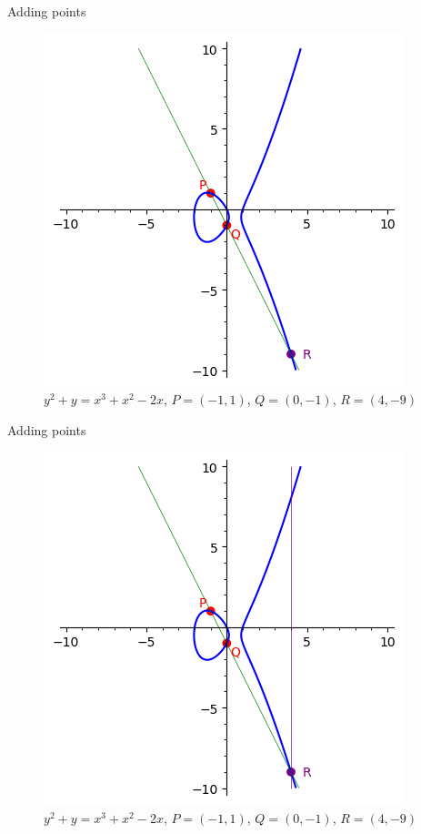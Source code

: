 \documentclass[aspectratio=169,xcolor=dvipsnames]{beamer}
\begin{document}

\begin{frame}{Adding points}
    \begin{figure}
        \centering
        \includegraphics[height=0.7\textheight]{adding-points-04.png}
        \caption{$y^2 + y = x^3 + x^2 - 2x$, $P=(-1,1)$, $Q=(0,-1)$, $R=(4,-9)$}
    \end{figure}
\end{frame}


\begin{frame}{Adding points}
    \begin{figure}
        \centering
        \includegraphics[height=0.7\textheight]{adding-points-05.png}
        \caption{$y^2 + y = x^3 + x^2 - 2x$, $P=(-1,1)$, $Q=(0,-1)$, $R=(4,-9)$}
    \end{figure}
\end{frame}
\end{document}
